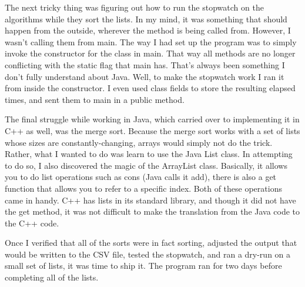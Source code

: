 The next tricky thing was figuring out how to run the stopwatch on the 
algorithms while they sort the lists. In my mind, it was something that should 
happen from the outside, wherever the method is being called from. However, I
wasn't calling them from main. The way I had set up the program was to simply
invoke the constructor for the class in main. That way all methods are no longer
conflicting with the static flag that main has. That's always been something I
don't fully understand about Java. Well, to make the stopwatch work I ran it
from inside the constructor. I even used class fields to store the resulting
elapsed times, and sent them to main in a public method.

The final struggle while working in Java, which carried over to implementing it
in C++ as well, was the merge sort. Because the merge sort works with a set of
lists whose sizes are constantly-changing, arrays would simply not do the trick.
Rather, what I wanted to do was learn to use the Java List class. In attempting
to do so, I also discovered the magic of the ArrayList class. Basically, it
allows you to do list operations such as cons (Java calls it add), there is also
a get function that allows you to refer to a specific index. Both of these
operations came in handy. C++ has lists in its standard library, and though it
did not have the get method, it was not difficult to make the translation from
the Java code to the C++ code.

Once I verified that all of the sorts were in fact sorting, adjusted the output
that would be written to the CSV file, tested the stopwatch, and ran a dry-run
on a small set of lists, it was time to ship it. The program ran for two days
before completing all of the lists. 
